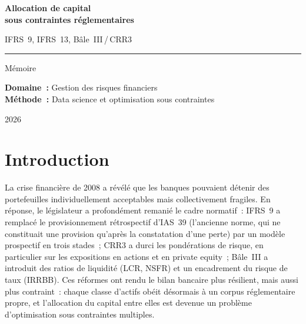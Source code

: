 \documentclass[10pt, a4paper, oneside]{report}
\theoremstyle{definition}
\begin{document}
\begin{titlepage}
\centering
\vspace*{3cm}

{\Huge\bfseries Allocation de capital\\[0.4em]
sous contraintes réglementaires}

\vspace{1.5cm}

{\LARGE IFRS~9, IFRS~13, Bâle~III\,/\,CRR3}

\vspace{3cm}

\rule{0.5\textwidth}{0.5pt}

\vspace{2cm}

{\Large Mémoire}

\vspace{1.5cm}

{\large
\textbf{Domaine~:} Gestion des risques financiers\\[0.5em]
\textbf{Méthode~:} Data science et optimisation sous contraintes
}

\vfill

{\large 2026}

\end{titlepage}
\thispagestyle{empty}

\tableofcontents
\newpage



\chapter*{Introduction}
\label{chap:introduction}


La crise financière de 2008 a révélé que les banques pouvaient détenir des portefeuilles individuellement acceptables mais collectivement fragiles.
En réponse, le législateur a profondément remanié le cadre normatif~: IFRS~9 \citep{ifrs9} a remplacé le provisionnement rétrospectif d'IAS~39 (l'ancienne norme, qui ne constituait une provision qu'après la constatation d'une perte) par un modèle prospectif en trois stades~; CRR3 \citep{crr3} a durci les pondérations de risque, en particulier sur les expositions en actions et en private equity~; Bâle~III \citep{bcbs_d424} a introduit des ratios de liquidité (LCR, NSFR) et un encadrement du risque de taux (IRRBB).
Ces réformes ont rendu le bilan bancaire plus résilient, mais aussi plus contraint~: chaque classe d'actifs obéit désormais à un corpus réglementaire propre, et l'allocation du capital entre elles est devenue un problème d'optimisation sous contraintes multiples.
\end{document}
